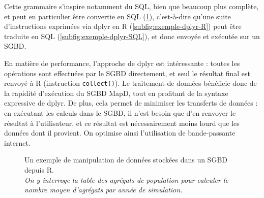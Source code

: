 Cette grammaire s'inspire notamment du SQL, bien que beaucoup plus complète, et peut en particulier être convertie en SQL (\cref{fig:dml-simedb}), c'est-à-dire qu'une suite d'instructions exprimées via \textsf{dplyr} en \textsf{R} (\cref{subfig:exemple-dplyr-R}) peut être traduite en SQL (\cref{subfig:exemple-dplyr-SQL}), et donc envoyée et exécutée sur un SGBD.

En matière de performance, l'approche de \textsf{dplyr} est intéressante : toutes les opérations sont effectuées par le SGBD directement, et seul le résultat final est renvoyé à \textsf{R} (instruction \texttt{collect()}).
Le traitement de données bénéficie donc de la rapidité d'exécution du SGBD MapD, tout en profitant de la syntaxe expressive de \textsf{dplyr}.
De plus, cela permet de minimiser les transferts de données : en exécutant les calculs dans le SGBD, il n'est besoin que d'en renvoyer le résultat à l'utilisateur, et ce résultat est nécessairement moins lourd que les données dont il provient.
On optimise ainsi l'utilisation de bande-passante internet.

\begin{figure}[H]
	\centering
	\hspace{5pt}
	\vspace{-0.3cm}
	\caption[Un exemple de manipulation de données stockées dans un SGBD depuis \textsf{R}.]{Un exemple de manipulation de données stockées dans un SGBD depuis \textsf{R}.\\
	\textit{On y interroge la table des agrégats de population pour calculer le nombre moyen d'agrégats par année de simulation.}}
	\label{fig:dml-simedb}
\end{figure}

